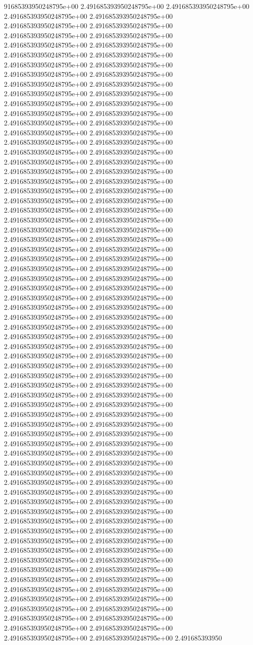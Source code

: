 91685393950248795e+00	2.491685393950248795e+00	2.491685393950248795e+00	2.491685393950248795e+00	2.491685393950248795e+00	2.491685393950248795e+00	2.491685393950248795e+00	2.491685393950248795e+00	2.491685393950248795e+00	2.491685393950248795e+00	2.491685393950248795e+00	2.491685393950248795e+00	2.491685393950248795e+00	2.491685393950248795e+00	2.491685393950248795e+00	2.491685393950248795e+00	2.491685393950248795e+00	2.491685393950248795e+00	2.491685393950248795e+00	2.491685393950248795e+00	2.491685393950248795e+00	2.491685393950248795e+00	2.491685393950248795e+00	2.491685393950248795e+00	2.491685393950248795e+00	2.491685393950248795e+00	2.491685393950248795e+00	2.491685393950248795e+00	2.491685393950248795e+00	2.491685393950248795e+00	2.491685393950248795e+00	2.491685393950248795e+00	2.491685393950248795e+00	2.491685393950248795e+00	2.491685393950248795e+00	2.491685393950248795e+00	2.491685393950248795e+00	2.491685393950248795e+00	2.491685393950248795e+00	2.491685393950248795e+00	2.491685393950248795e+00	2.491685393950248795e+00	2.491685393950248795e+00	2.491685393950248795e+00	2.491685393950248795e+00	2.491685393950248795e+00	2.491685393950248795e+00	2.491685393950248795e+00	2.491685393950248795e+00	2.491685393950248795e+00	2.491685393950248795e+00	2.491685393950248795e+00	2.491685393950248795e+00	2.491685393950248795e+00	2.491685393950248795e+00	2.491685393950248795e+00	2.491685393950248795e+00	2.491685393950248795e+00	2.491685393950248795e+00	2.491685393950248795e+00	2.491685393950248795e+00	2.491685393950248795e+00	2.491685393950248795e+00	2.491685393950248795e+00	2.491685393950248795e+00	2.491685393950248795e+00	2.491685393950248795e+00	2.491685393950248795e+00	2.491685393950248795e+00	2.491685393950248795e+00	2.491685393950248795e+00	2.491685393950248795e+00	2.491685393950248795e+00	2.491685393950248795e+00	2.491685393950248795e+00	2.491685393950248795e+00	2.491685393950248795e+00	2.491685393950248795e+00	2.491685393950248795e+00	2.491685393950248795e+00	2.491685393950248795e+00	2.491685393950248795e+00	2.491685393950248795e+00	2.491685393950248795e+00	2.491685393950248795e+00	2.491685393950248795e+00	2.491685393950248795e+00	2.491685393950248795e+00	2.491685393950248795e+00	2.491685393950248795e+00	2.491685393950248795e+00	2.491685393950248795e+00	2.491685393950248795e+00	2.491685393950248795e+00	2.491685393950248795e+00	2.491685393950248795e+00	2.491685393950248795e+00	2.491685393950248795e+00	2.491685393950248795e+00	2.491685393950248795e+00	2.491685393950248795e+00	2.491685393950248795e+00	2.491685393950248795e+00	2.491685393950248795e+00	2.491685393950248795e+00	2.491685393950248795e+00	2.491685393950248795e+00	2.491685393950248795e+00	2.491685393950248795e+00	2.491685393950248795e+00	2.491685393950248795e+00	2.491685393950248795e+00	2.491685393950248795e+00	2.491685393950248795e+00	2.491685393950248795e+00	2.491685393950248795e+00	2.491685393950248795e+00	2.491685393950248795e+00	2.491685393950248795e+00	2.491685393950248795e+00	2.491685393950248795e+00	2.491685393950248795e+00	2.491685393950248795e+00	2.491685393950248795e+00	2.491685393950248795e+00	2.491685393950248795e+00	2.491685393950248795e+00	2.491685393950248795e+00	2.491685393950248795e+00	2.491685393950248795e+00	2.491685393950248795e+00	2.491685393950248795e+00	2.491685393950248795e+00	2.491685393950